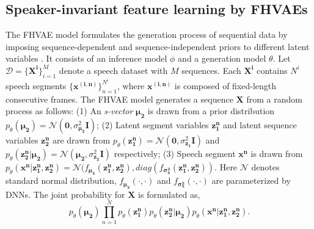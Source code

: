 \documentclass[a4paper]{article}
\begin{document}
\subsection{Speaker-invariant feature learning by FHVAEs}
\label{subsec:fhvae}
The FHVAE model formulates the generation process of sequential data by imposing sequence-dependent and sequence-independent priors to different latent variables \cite{hsu2017nips}. It consists of an inference model $\phi$ and a generation model $\theta$.
Let $\mathcal{D}=\{\bm{X^{i}}\}_{i=1}^{M}$ denote a speech dataset with $M$ sequences. 
Each $\bm{X^i}$ contains $N^i$ speech segments $\{\bm{x^{(i,n)}}\}^{N^i}_{n=1}$, where $\bm{x^{(i,n)}}$ is composed of fixed-length consecutive 
frames. The FHVAE model generates a sequence $\bm{X}$ from a random process as follows: 
(1) An \textit{s-vector} $\bm{\mu_2 }$ is drawn from a prior distribution $p_{\theta}(\bm{\mu_2})=\mathcal{N} (\bm{0},\sigma^2_{\bm{\mu_2}} \bm{I})$;
(2) Latent segment variables $\bm{z_1 ^{n}} $ and latent sequence variables $\bm{z_2^{n}} $ are drawn from $p_{\theta}(\bm{z_1 ^{n}})=\mathcal{N} (\bm{0}, {\sigma^2_{\bm{z_1}}} \bm{I})$ and  $p_{\theta}(\bm{z_2 ^{n}| \bm{\mu_2}})=\mathcal{N}(\bm{\mu_2}, {\sigma^2_{\bm{z_2}}} \bm{I} )$ respectively;
(3) Speech segment $\bm{x^{n}}$ is drawn from $p_{\theta}(\bm{x^{n}}|\bm{z_1 ^{n}, \bm{z_2^{n}}})=\mathcal{N}(f_{\bm{\mu_x}} (\bm{z_1 ^{n}}, \bm{z_2^{n}}), diag(f_{\bm{\sigma^2_x}} (\bm{z_1 ^{n}}, \bm{z_2^{n}}))$.
Here $\mathcal{N}$ denotes standard normal distribution, $ f_{\bm{\mu_x}} (\cdot, \cdot)$ and $ f_{\bm{\sigma^2_x}} (\cdot, \cdot)$ are parameterized by DNNs.
The joint probability for $\bm{X}$ is formulated as,
\begin{equation}
    p_{\theta} (\bm{\mu_2})\prod_{n=1}^{N} p_{\theta} (\bm{z_1^n}) p_{\theta} (\bm{z_2^{n}}|\bm{\mu_2})p_{\theta} (\bm{x^n}|\bm{z_1 ^{n}, \bm{z_2^{n}}}).
\end{equation}
\end{document}

